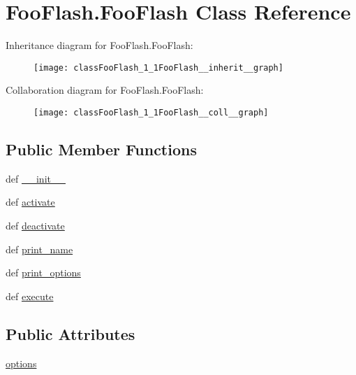 \hypertarget{classFooFlash_1_1FooFlash}{\section{Foo\-Flash.\-Foo\-Flash Class Reference}
\label{classFooFlash_1_1FooFlash}
}


Inheritance diagram for Foo\-Flash.\-Foo\-Flash\-:\nopagebreak
\begin{figure}[H]
\begin{center}
\leavevmode
\texttt{[image: classFooFlash\_1\_1FooFlash\_\_inherit\_\_graph]}
\end{center}
\end{figure}


Collaboration diagram for Foo\-Flash.\-Foo\-Flash\-:\nopagebreak
\begin{figure}[H]
\begin{center}
\leavevmode
\texttt{[image: classFooFlash\_1\_1FooFlash\_\_coll\_\_graph]}
\end{center}
\end{figure}
\subsection*{Public Member Functions}
\begin{DoxyCompactItemize}
\item 
def \hyperlink{classFooFlash_1_1FooFlash_ac1f82360ff55e91754e623f7b63227b2}{\-\_\-\-\_\-init\-\_\-\-\_\-}
\item 
def \hyperlink{classFooFlash_1_1FooFlash_a68b7e114628ec6cae08032fdc1be5c11}{activate}
\item 
def \hyperlink{classFooFlash_1_1FooFlash_a3bf44a158ded7bff744b9eca184cd62f}{deactivate}
\item 
def \hyperlink{classFooFlash_1_1FooFlash_a8c62ade706f87c593022ff5b1c77e0d9}{print\-\_\-name}
\item 
def \hyperlink{classFooFlash_1_1FooFlash_a1811c90a7d26b089f66f033e2b05fcf8}{print\-\_\-options}
\item 
def \hyperlink{classFooFlash_1_1FooFlash_ad834239b94a33ba8e970b678bbf20963}{execute}
\end{DoxyCompactItemize}
\subsection*{Public Attributes}
\begin{DoxyCompactItemize}
\item 
\hyperlink{classFooFlash_1_1FooFlash_a4ea7b75eb8b8ed247ae89aeb469bda01}{options}
\end{DoxyCompactItemize}


